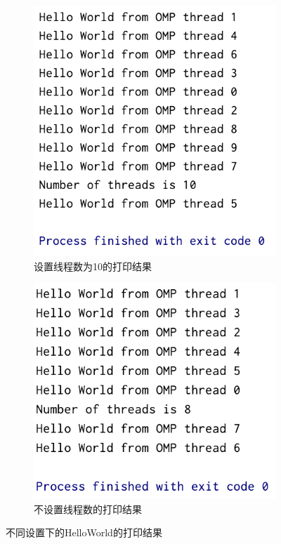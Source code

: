 \documentclass{article}
\begin{document}
\begin{figure}[H]
    \begin{subfigure}[b]{0.45\textwidth}
        \centering
        \includegraphics[width=\textwidth]{set10.png}
        \caption{设置线程数为10的打印结果}
        \label{fig:4}
    \end{subfigure}
    \hfill
    \begin{subfigure}[b]{0.45\textwidth}
        \centering
        \includegraphics[width=\textwidth]{noset.png}
        \caption{不设置线程数的打印结果}
        \label{fig:5}
    \end{subfigure}
    \caption{不同设置下的HelloWorld的打印结果}
\end{figure}
\end{document}
